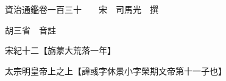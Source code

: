 










 


 
 


 

  
  
  
  
  





  
  
  
  
  
 
  

  

  
  
  



  

 
 

  
   




  

  
  


  　　資治通鑑卷一百三十　　宋　司馬光　撰

　　胡三省　音註

　　宋紀十二【旃蒙大荒落一年】

　　太宗明皇帝上之上【諱彧字休景小字榮期文帝第十一子也】

